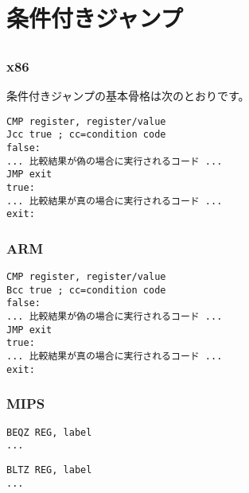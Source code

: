 \section{条件付きジャンプ}
\label{sec:Jcc}






\subsection{\Conclusion{}}

\subsubsection{x86}

条件付きジャンプの基本骨格は次のとおりです。

\begin{lstlisting}[caption=x86,style=customasmx86]
CMP register, register/value
Jcc true ; cc=condition code
false:
... 比較結果が偽の場合に実行されるコード ...
JMP exit 
true:
... 比較結果が真の場合に実行されるコード ...
exit:
\end{lstlisting}

\subsubsection{ARM}

\begin{lstlisting}[caption=ARM,style=customasmARM]
CMP register, register/value
Bcc true ; cc=condition code
false:
... 比較結果が偽の場合に実行されるコード ...
JMP exit 
true:
... 比較結果が真の場合に実行されるコード ...
exit:
\end{lstlisting}

\subsubsection{MIPS}

\begin{lstlisting}[caption=Check for zero,style=customasmMIPS]
BEQZ REG, label
...
\end{lstlisting}

\begin{lstlisting}[caption=Check for less than zero using pseudoinstruction,style=customasmMIPS]
BLTZ REG, label
...
\end{lstlisting}


